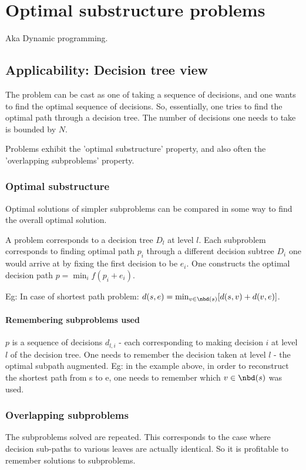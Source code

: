 \documentclass[oneside, article]{memoir}
\begin{document}
\chapter{Optimal substructure problems}
Aka Dynamic programming.

\section{Applicability: Decision tree view}
The problem can be cast as one of taking a sequence of decisions, and one wants to find the optimal sequence of decisions. So, essentially, one tries to find the optimal path through a decision tree. The number of decisions one needs to take is bounded by $N$.

Problems exhibit the 'optimal substructure' property, and also often the 'overlapping subproblems' property.

\subsection{Optimal substructure}
Optimal solutions of simpler subproblems can be compared in some way to find the overall optimal solution.

A problem corresponds to a decision tree $D_l$ at level $l$. Each subproblem corresponds to finding optimal path $p_i$ through a different decision subtree $D_i$ one would arrive at by fixing the first decision to be $e_i$. One constructs the optimal decision path $p= \min_i f(p_i + e_i)$.

Eg: In case of shortest path problem: $d(s, e) = \min_{v \in \nbd(s)}[d(s, v) + d(v, e)]$.

\subsubsection{Remembering subproblems used}
$p$ is a sequence of decisions $d_{l, i}$ - each corresponding to making decision $i$ at level $l$ of the decision tree. One needs to remember the decision taken at level $l$ - the optimal subpath augmented. Eg: in the example above, in order to reconstruct the shortest path from s to e, one needs to remember which $v \in \nbd(s)$ was used. 

\subsection{Overlapping subproblems}
The subproblems solved are repeated. This corresponds to the case where decision sub-paths to various leaves are actually identical. So it is profitable to remember solutions to subproblems.
\end{document}
